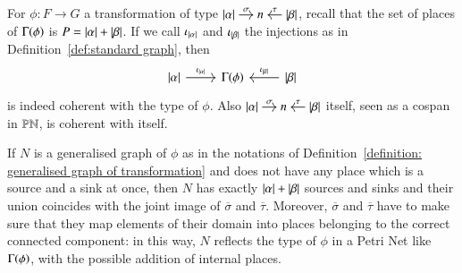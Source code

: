 \begin{example}\label{example: graph and type are a generalised graph}
    For $\phi \colon F \to G$ a transformation of type
    $
    \begin{tikzcd}[cramped,sep=small]
    \length\alpha \ar[r,"\sigma"] & n & \length\beta \ar[l,"\tau"']
    \end{tikzcd}
    $,
    recall that the set of places of $\graph\phi$ is $P = \lvert \alpha \rvert + \lvert \beta \rvert$. If we call $\iota_{\lvert \alpha \rvert}$ and $\iota_{\lvert \beta \rvert}$ the injections as in Definition~\ref{def:standard graph}, then
    \[
    \begin{tikzcd}
    \length\alpha \ar[r,"\injP{\length\alpha}"] & \Gamma(\phi) & \ar[l,"\injP{\length\beta}"'] \length\beta
    \end{tikzcd}
    \]
    is indeed coherent with the type of $\phi$.
    Also $
    \begin{tikzcd}[cramped,sep=small]
    \length\alpha \ar[r,"\sigma"] & n & \length\beta \ar[l,"\tau"']
    \end{tikzcd}
    $
    itself, seen as a cospan in $\mathbb{PN}$, is coherent with itself. %
\end{example}

\begin{remark}
    If $N$ is a generalised graph of $\phi$ as in the notations of Definition~\ref{definition: generalised graph of transformation} and does not have any place which is a source and a sink at once, then $N$ has exactly $\lvert \alpha \rvert + \lvert \beta \rvert$ sources and sinks and their union coincides with the joint image of $\overline\sigma$ and $\overline\tau$.  Moreover, $\overline\sigma$ and $\overline\tau$ have to make sure that they map elements of their domain into places belonging to the correct connected component: in this way, $N$ reflects the type of $\phi$ in a Petri Net like $\graph\phi$, with the possible addition of internal places.
\end{remark}

